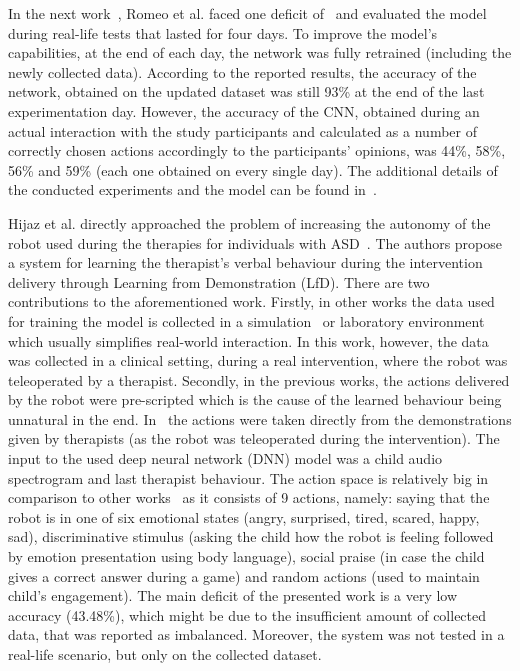 \documentclass[thesis]{mas_proposal}
\begin{document}
In the next work~\cite{Romeo2019}, Romeo et al. faced one deficit of~\cite{Romeo2018} and evaluated the model during real-life tests that lasted for four days. To improve the model's capabilities, at the end of each day, the network was fully retrained (including the newly collected data). According to the reported results, the accuracy of the network, obtained on the updated dataset was still 93\% at the end of the last experimentation day. However, the accuracy of the CNN, obtained during an actual interaction with the study participants and calculated as a number of correctly chosen actions accordingly to the participants' opinions, was 44\%, 58\%, 56\% and 59\% (each one obtained on every single day). The additional details of the conducted experiments and the model can be found in~\cite{romeo2021human}.

Hijaz et al. directly approached the problem of increasing the autonomy of the robot used during the therapies for individuals with ASD~\cite{Hijaz2021}. The authors propose a system for learning the therapist's verbal behaviour during the intervention delivery through Learning from Demonstration (LfD). There are two contributions to the aforementioned work. Firstly, in other works the data used for training the model is collected in a simulation~\cite{Turner2018,Belo2021,Belo2022} or laboratory environment~\cite{ClarkTurner2017,Turner2018,Romeo2018,carpio2019learning} which usually simplifies real-world interaction. In this work, however, the data was collected in a clinical setting, during a real intervention, where the robot was teleoperated by a therapist. Secondly, in the previous works, the actions delivered by the robot were pre-scripted which is the cause of the learned behaviour being unnatural in the end. In~\cite{Hijaz2021} the actions were taken directly from the demonstrations given by therapists (as the robot was teleoperated during the intervention). The input to the used deep neural network (DNN) model was a child audio spectrogram and last therapist behaviour. The action space is relatively big in comparison to other works~\cite{Qureshi2016,Qureshi2017,Qureshi2018,ClarkTurner2017,Turner2018,Belo2021,Belo2022,Romeo2018,Romeo2019} as it consists of 9 actions, namely: saying that the robot is in one of six emotional states (angry, surprised, tired, scared, happy, sad), discriminative stimulus (asking the child how the robot is feeling followed by emotion presentation using body language), social praise (in case the child gives a correct answer during a game) and random actions (used to maintain child's engagement). The main deficit of the presented work is a very low accuracy (43.48\%), which might be due to the insufficient amount of collected data, that was reported as imbalanced. Moreover, the system was not tested in a real-life scenario, but only on the collected dataset.
\end{document}
